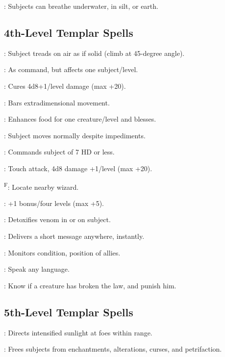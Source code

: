 : Subjects can breathe underwater, in silt, or earth.



\subsection{4th-Level Templar Spells}

: Subject treads on air as if solid (climb at 45-degree angle).

: As command, but affects one subject/level.

: Cures 4d8+1/level damage (max +20).

: Bars extradimensional movement.

: Enhances food for one creature/level and blesses.

: Subject moves normally despite impediments.

: Commands subject of 7 HD or less.

: Touch attack, 4d8 damage +1/level (max +20).

\textsuperscript{F}: Locate nearby wizard.

: +1 bonus/four levels (max +5).

: Detoxifies venom in or on subject.

: Delivers a short message anywhere, instantly.

: Monitors condition, position of allies.

: Speak any language.

: Know if a creature has broken the law, and punish him.



\subsection{5th-Level Templar Spells}

: Directs intensified sunlight at foes within range.

: Frees subjects from enchantments, alterations, curses, and petrifaction.

